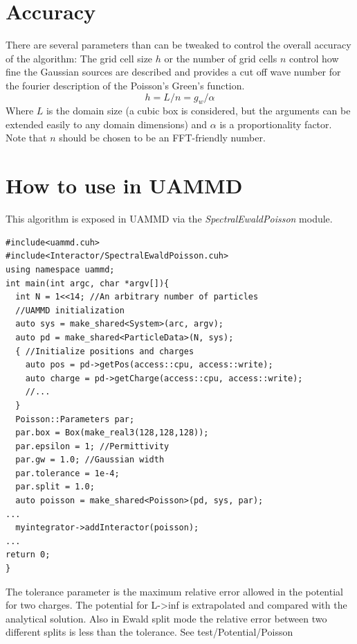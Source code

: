 \documentclass[ twoside,openright,titlepage,numbers=noenddot,%
headinclude,footinclude,cleardoublepage=empty,abstract=on,
BCOR=5mm,paper=a4,fontsize=11pt, dvipsnames
]{scrreprt}
\newcommand{\uammd}{\gls{UAMMD}\xspace}
\begin{document}
\section{Accuracy}
There are several parameters than can be tweaked to control the overall accuracy of the algorithm:
The grid cell size $h$ or the number of grid cells $n$ control how fine the Gaussian sources are described and provides a cut off wave number for the fourier description of the Poisson's Green's function.
\begin{equation}
h = L/n = g_w/\alpha
\end{equation}
Where $L$ is the domain size (a cubic box is considered, but the arguments can be extended easily to any domain dimensions) and $\alpha$ is a proportionality factor. Note that $n$ should be chosen to be an \gls{FFT}-friendly number.


\section{How to use in UAMMD}

This algorithm is exposed in \uammd via the \emph{SpectralEwaldPoisson} module.

\begin{verbatim}
#include<uammd.cuh>
#include<Interactor/SpectralEwaldPoisson.cuh>
using namespace uammd;
int main(int argc, char *argv[]){
  int N = 1<<14; //An arbitrary number of particles
  //UAMMD initialization
  auto sys = make_shared<System>(arc, argv);
  auto pd = make_shared<ParticleData>(N, sys);
  { //Initialize positions and charges
    auto pos = pd->getPos(access::cpu, access::write);
    auto charge = pd->getCharge(access::cpu, access::write);
    //...
  }
  Poisson::Parameters par;
  par.box = Box(make_real3(128,128,128));
  par.epsilon = 1; //Permittivity
  par.gw = 1.0; //Gaussian width
  par.tolerance = 1e-4;
  par.split = 1.0;
  auto poisson = make_shared<Poisson>(pd, sys, par);
...
  myintegrator->addInteractor(poisson);
...
return 0;
}
\end{verbatim}
The tolerance parameter is the maximum relative error allowed in the potential for two charges. The potential for L->inf is extrapolated and compared with the analytical solution. Also in Ewald split mode the relative error between two different splits is less than the tolerance. See test/Potential/Poisson  
%
\end{document}
